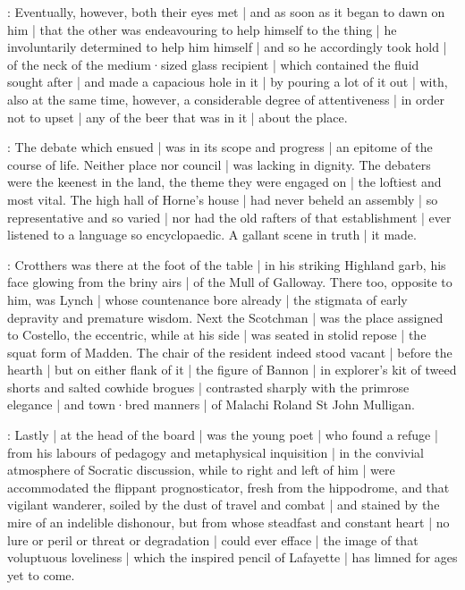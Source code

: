 :
Eventually,
however,
both their eyes met |
and as soon as it began to dawn on him |
that the other was endeavouring to help himself to the thing |
he involuntarily determined to help him himself |
and so he accordingly took hold |
of the neck of the medium·sized glass recipient |
which contained the fluid sought after |
and made a capacious hole in it |
by pouring a lot of it out |
with,
also at the same time,
however,
a considerable degree of attentiveness |
in order not to upset |
any of the beer that was in it |
about the place.


:
The debate which ensued |
was in its scope and progress |
an epitome of the course of life.
Neither place nor council |
was lacking in dignity.
The debaters were the keenest in the land,
the theme they were engaged on |
the loftiest and most vital.
The high hall of Horne's house |
had never beheld an assembly |
so representative and so varied |
nor had the old rafters of that establishment |
ever listened to a language so encyclopaedic.
A gallant scene in truth |
it made.

:
Crotthers was there at the foot of the table |
in his striking Highland garb,
his face glowing from the briny airs |
of the Mull of Galloway.
There too,
opposite to him,
was Lynch |
whose countenance bore already |
the stigmata of early depravity and premature wisdom.
Next the Scotchman |
was the place assigned to Costello,
the eccentric,
while at his side |
was seated in stolid repose |
the squat form of Madden.
The chair of the resident indeed stood vacant |
before the hearth |
but on either flank of it |
the figure of Bannon |
in explorer's kit of tweed shorts and salted cowhide brogues |
contrasted sharply with the primrose elegance |
and town·bred manners |
of Malachi Roland St John Mulligan.

:
Lastly |
at the head of the board |
was the young poet |
who found a refuge |
from his labours of pedagogy and metaphysical inquisition |
in the convivial atmosphere of Socratic discussion,
while to right and left of him |
were accommodated the flippant prognosticator,
fresh from the hippodrome,
and that vigilant wanderer,
soiled by the dust of travel and combat |
and stained by the mire of an indelible dishonour,
but from whose steadfast and constant heart |
no lure or peril or threat or degradation |
could ever efface |
the image of that voluptuous loveliness |
which the inspired pencil of Lafayette |
has limned for ages yet to come.


